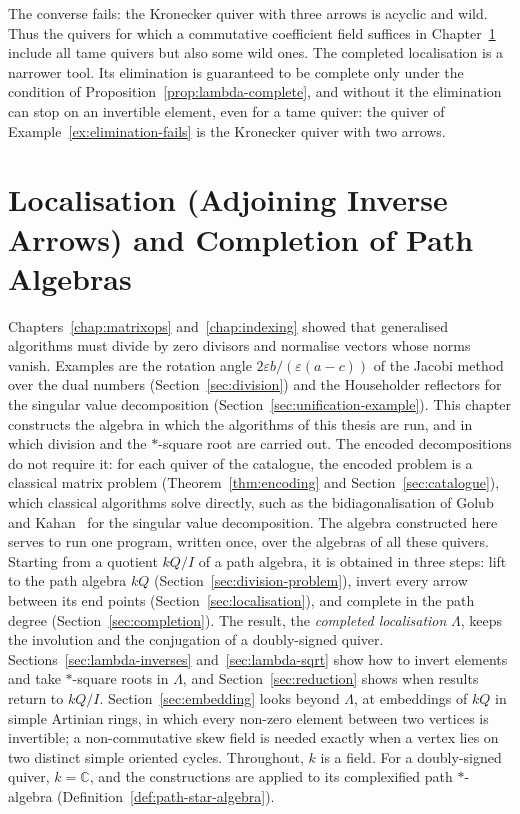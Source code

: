 \documentclass[12pt, a4paper]{report}
\theoremstyle{plain}
\theoremstyle{definition}
\theoremstyle{remark}
\theoremstyle{plain}
\newcommand{\CC}{\mathbb{C}}
\begin{document}
The converse fails: the Kronecker quiver with three arrows is acyclic and wild. Thus the quivers for which a commutative coefficient field suffices in Chapter~\ref{division-problem} include all tame quivers but also some wild ones. The completed localisation is a narrower tool. Its elimination is guaranteed to be complete only under the condition of Proposition~\ref{prop:lambda-complete}, and without it the elimination can stop on an invertible element, even for a tame quiver: the quiver of Example~\ref{ex:elimination-fails} is the Kronecker quiver with two arrows.
\chapter{Localisation (Adjoining Inverse Arrows) and Completion of Path Algebras}
\label{division-problem}

Chapters~\ref{chap:matrixops} and~\ref{chap:indexing} showed that generalised algorithms must divide by zero divisors and normalise vectors whose norms vanish. Examples are the rotation angle $2\varepsilon b/(\varepsilon(a-c))$ of the Jacobi method over the dual numbers (Section~\ref{sec:division}) and the Householder reflectors for the singular value decomposition (Section~\ref{sec:unification-example}). This chapter constructs the algebra in which the algorithms of this thesis are run, and in which division and the $*$-square root are carried out. The encoded decompositions do not require it: for each quiver of the catalogue, the encoded problem is a classical matrix problem (Theorem~\ref{thm:encoding} and Section~\ref{sec:catalogue}), which classical algorithms solve directly, such as the bidiagonalisation of Golub and Kahan~\cite{GolubKahan1965} for the singular value decomposition. The algebra constructed here serves to run one program, written once, over the algebras of all these quivers. Starting from a quotient $kQ/I$ of a path algebra, it is obtained in three steps: lift to the path algebra $kQ$ (Section~\ref{sec:division-problem}), invert every arrow between its end points (Section~\ref{sec:localisation}), and complete in the path degree (Section~\ref{sec:completion}). The result, the \emph{completed localisation} $\Lambda$, keeps the involution and the conjugation of a doubly-signed quiver. Sections~\ref{sec:lambda-inverses} and~\ref{sec:lambda-sqrt} show how to invert elements and take $*$-square roots in $\Lambda$, and Section~\ref{sec:reduction} shows when results return to $kQ/I$. Section~\ref{sec:embedding} looks beyond $\Lambda$, at embeddings of $kQ$ in simple Artinian rings, in which every non-zero element between two vertices is invertible; a non-commutative skew field is needed exactly when a vertex lies on two distinct simple oriented cycles. Throughout, $k$ is a field. For a doubly-signed quiver, $k=\CC$, and the constructions are applied to its complexified path $*$-algebra (Definition~\ref{def:path-star-algebra}).
\end{document}
